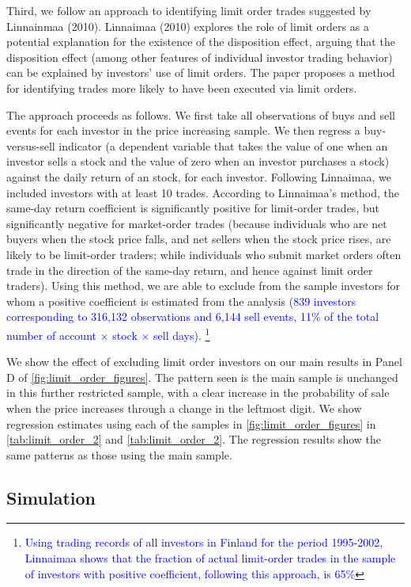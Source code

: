Third, we follow an approach to identifying limit order trades suggested by  Linnainmaa (2010). Linnaimaa (2010) explores the role of limit orders as a potential explanation for the existence of the disposition effect, arguing that the disposition effect (among other features of individual investor trading behavior) can be explained by investors' use of limit orders. The paper proposes a method for identifying trades more likely to have been executed via limit orders.  

The approach proceeds as follows. We first take all observations of buys and sell events for each investor in the price increasing sample. We then regress a buy-versus-sell indicator (a dependent variable that takes the value of one when an investor sells a stock and the value of zero when an investor purchases a stock) against the daily return of an stock, for each investor. Following Linnaimaa, we included investors with at least 10 trades. According to Linnaimaa's method, the same-day return coefficient is significantly positive for limit-order trades, but significantly negative for market-order trades (because individuals who are net buyers when the stock price falls, and net sellers when the stock price rises, are likely to be limit-order traders; while individuals who submit market orders often trade in the direction of the same-day return, and hence against limit order traders). Using this method, we are able to exclude from the sample investors for whom a positive coefficient is estimated from the analysis (\textcolor{blue}{839 investors corresponding to 316,132 observations and 6,144 sell events, 11\% of the total number of account $\times$ stock $\times$ sell days}).
\footnote{\textcolor{blue}{Using trading records of all investors in Finland for the period 1995-2002, Linnaimaa shows that the fraction of actual limit-order trades in the sample of investors with positive coefficient, following this approach, is 65\%}}

We show the effect of excluding limit order investors on our main results in Panel D of \ref{fig:limit_order_figures}. The pattern seen is the main sample is unchanged in this further restricted sample, with a clear increase in the probability of sale when the price increases through a change in the leftmost digit. We show regression estimates using each of the samples in \ref{fig:limit_order_figures} in \ref{tab:limit_order_2} and  \ref{tab:limit_order_2}. The regression results show the same patterns as those using the main sample.

\subsection{Simulation}

